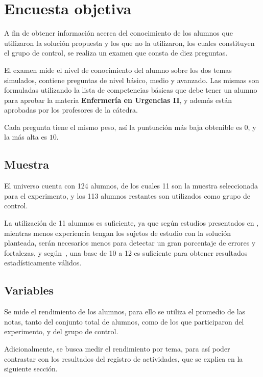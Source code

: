 \section{Encuesta objetiva}
\label{sec:objetiva}

A fin de obtener información acerca del conocimiento de los alumnos que
utilizaron la solución propuesta y los que no la utilizaron, los cuales
constituyen el grupo de control, se realiza un examen que consta de diez
preguntas.

El examen mide el nivel de conocimiento del alumno sobre los dos temas
simulados, contiene preguntas de nivel básico, medio y avanzado. Las mismas son
formuladas utilizando la lista de competencias básicas que debe tener un alumno
para aprobar la materia \textbf{Enfermería en Urgencias II}, y además están
aprobadas por los profesores de la cátedra.

Cada pregunta tiene el mismo peso, así la puntuación más baja obtenible es $0$, y
la más alta es $10$.

\subsection{Muestra}

El universo cuenta con 124 alumnos, de los cuales 11 son la muestra seleccionada
para el experimento, y los 113 alumnos restantes son utilizados
como grupo de control.

La utilización de 11 alumnos es suficiente, ya que según estudios presentados en
\cite{nielsen2000}, mientras menos experiencia tengan los sujetos de estudio con
la solución planteada, serán necesarios menos para detectar un gran porcentaje
de errores y fortalezas, y según~\cite{ritch2009}, una base de 10 a 12 es
suficiente para obtener resultados estadísticamente válidos.


\subsection{Variables}


Se mide el rendimiento de los alumnos, para ello se utiliza el promedio de las
notas, tanto del conjunto total de alumnos, como de los que participaron del
experimento, y del grupo de control.

Adicionalmente, se busca medir el rendimiento por tema, para así poder
contrastar con los resultados del registro de actividades, que se explica en la
siguiente sección.

